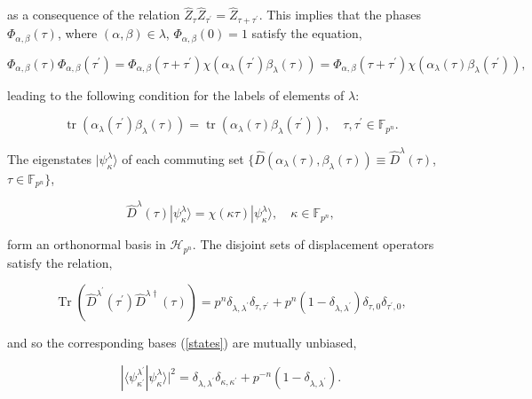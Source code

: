 \documentclass[quantumrep,article,submit,pdftex,moreauthors]{Definitions/mdpi}
\DeclareMathOperator{\tr}{tr}
\DeclareMathOperator{\Tr}{Tr}
\begin{document}
as a consequence of the relation $\hat{Z}_{\tau}\hat{Z}_{\tau^{\prime}} =
\hat{Z}_{\tau+\tau^{\prime}}$. This implies that the phases
$\Phi_{\alpha,\beta}\left( \tau \right)$, where $(\alpha ,\beta )\in \lambda$,
$\Phi_{\alpha,\beta}\left(0\right) = 1$ satisfy the equation,

\begin{equation}
  \Phi_{\alpha,\beta}\left( \tau \right)
  \Phi_{\alpha,\beta }\left(\tau^{\prime}\right)
  = \Phi_{\alpha,\beta}\left( \tau+\tau^{\prime} \right)
  \chi\left( \alpha_{\lambda}(\tau^{\prime})\beta_{\lambda}(\tau) \right)
  = \Phi_{\alpha,\beta}\left(\tau+\tau^{\prime}\right)
  \chi\left(\alpha_{\lambda}(\tau)\beta_{\lambda}(\tau^{\prime })\right),
  \label{Phi}
\end{equation}

leading to the following condition for the labels of elements of $\lambda$:

\begin{equation}
  \tr\left(\alpha_{\lambda}(\tau^{\prime})\beta_{\lambda }(\tau)\right)
  = \tr\left(\alpha_{\lambda}(\tau)\beta_{\lambda}(\tau^{\prime})\right),
  \quad \tau,\tau^{\prime} \in \mathbb{F}_{p^{n}}.
  \label{CC}
\end{equation}

The eigenstates $|\psi_\kappa^\lambda\rangle$ of each commuting set
$\{\hat{D}\left(\alpha_{\lambda}(\tau),\beta_{\lambda}(\tau)\right) \equiv
\hat{D}^{\lambda}(\tau)$, $\tau \in \mathbb{F}_{p^{n}}\}$,

\begin{equation}
  \hat{D}^{\lambda}(\tau)|\psi_{\kappa}^{\lambda}\rangle
  = \chi(\kappa \tau) |\psi_{\kappa}^{\lambda}\rangle,
  \quad \kappa \in \mathbb{F}_{p^{n}},
  \label{states}
\end{equation}

form an orthonormal basis in $\mathcal{H}_{p^{n}}$. The disjoint sets of
displacement operators satisfy the relation,

\begin{equation*}
  \Tr\left(
    \hat{D}^{\lambda^{\prime}}(\tau^{\prime})\hat{D}^{\lambda\dagger}(\tau)
  \right)
  = p^{n} \delta_{\lambda,\lambda^{\prime}} \delta_{\tau,\tau^{\prime}}
  + p^{n}(1-\delta_{\lambda,\lambda^{\prime}}) \delta_{\tau,0}
  \delta_{\tau^{\prime},0},
\end{equation*}

and so the corresponding bases (\ref{states}) are mutually unbiased,

\begin{equation}
  |\langle\psi_{\kappa^{\prime}}^{\lambda^{\prime}}
  |\psi_{\kappa}^{\lambda}\rangle|^{2}
  = \delta_{\lambda,\lambda^{\prime}} \delta_{\kappa,\kappa^{\prime}}
  + p^{-n} (1-\delta_{\lambda,\lambda^{\prime}}).
  \label{UB}
\end{equation}
\end{document}
